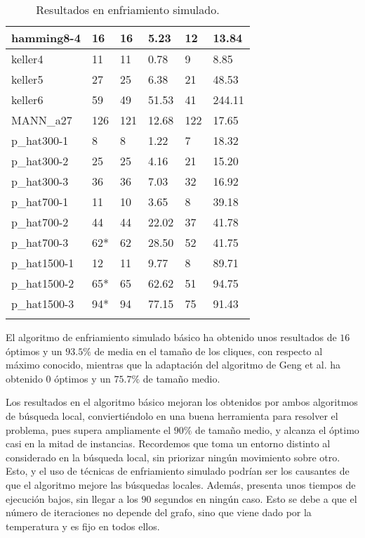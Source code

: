 \begin{small}
\begin{longtable}{l l l l l l}
    hamming8-4         & 16 & 16 & 5.23 & 12 & 13.84 \\ \hline
    keller4            & 11 & 11 & 0.78 & 9 & 8.85 \\ \hline
    keller5            & 27 & 25 & 6.38 & 21 & 48.53 \\ \hline
    keller6            & 59 & 49 & 51.53 & 41 & 244.11 \\ \hline
    MANN\_a27          & 126 & 121 & 12.68 & 122 & 17.65 \\ \hline
    p\_hat300-1        & 8 & 8 & 1.22 & 7 & 18.32 \\ \hline
    p\_hat300-2        & 25 & 25 & 4.16 & 21 & 15.20 \\ \hline
    p\_hat300-3        & 36 & 36 & 7.03 & 32 & 16.92 \\ \hline
    p\_hat700-1        & 11 & 10 & 3.65 & 8 & 39.18 \\ \hline
    p\_hat700-2        & 44 & 44 & 22.02 & 37 & 41.78 \\ \hline
    p\_hat700-3        & 62* & 62 & 28.50 & 52 & 41.75 \\ \hline
    p\_hat1500-1       & 12 & 11 & 9.77 & 8 & 89.71 \\ \hline
    p\_hat1500-2       & 65* & 65 & 62.62 & 51 & 94.75 \\ \hline
    p\_hat1500-3       & 94* & 94 & 77.15 & 75 & 91.43 \\ \hline
  \caption{Resultados en enfriamiento simulado.}
\end{longtable}
\end{small}

El algoritmo de enfriamiento simulado básico ha obtenido unos resultados de $16$
óptimos y un $93.5\%$ de media en el tamaño de los cliques, con respecto al máximo
conocido, mientras que la adaptación del algoritmo de Geng et al. ha obtenido
$0$ óptimos y un $75.7\%$ de tamaño medio.

Los resultados en el algoritmo básico mejoran los obtenidos por ambos algoritmos
de búsqueda local, conviertiéndolo en una buena herramienta para resolver el problema,
pues supera ampliamente el $90\%$ de tamaño medio, y alcanza el óptimo casi en la
mitad de instancias. Recordemos que toma un entorno distinto al considerado en la
búsqueda local, sin priorizar ningún movimiento sobre otro. Esto, y el uso de
técnicas de enfriamiento simulado podrían ser los causantes de que el algoritmo
mejore las búsquedas locales. Además, presenta unos tiempos de ejecución bajos,
sin llegar a los $90$ segundos en ningún caso. Esto se debe a que el número de
iteraciones no depende del grafo, sino que viene dado por la temperatura y es
fijo en todos ellos.

